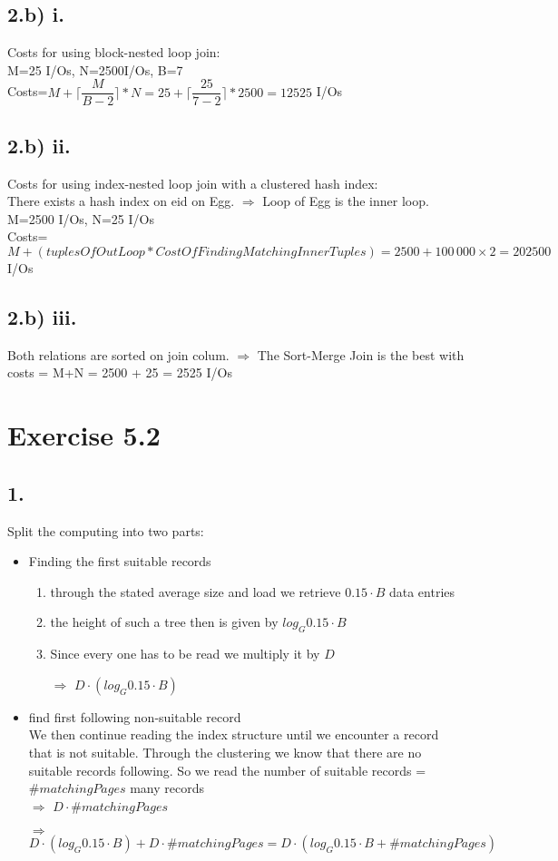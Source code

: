 \documentclass[12pt]{article}
\begin{document}
	\subsection*{2.b) i.}
	Costs for using block-nested loop join:\\
	M=25 I/Os, N=2500I/Os, B=7\\
	Costs=$M+\lceil \dfrac{M}{B-2} \rceil\ast N = 25+\lceil \dfrac{25}{7-2}\rceil \ast 2500=12525$ I/Os \\
	\subsection*{2.b) ii.}
	Costs for using index-nested loop join with a clustered hash index:\\
	There exists a hash index on eid on Egg. $\Rightarrow$ Loop of Egg is the inner loop.\\
	M=2500 I/Os, N=25 I/Os\\
	Costs=$M+(tuplesOfOutLoop\ast CostOfFindingMatchingInnerTuples)=2500+100\,000\times 2=202500$ I/Os
	\subsection*{2.b) iii.}
	Both relations are sorted on join colum. $\Rightarrow$ The Sort-Merge Join is the best with\\
	costs = M+N = 2500 + 25 = 2525 I/Os
	\section*{Exercise 5.2}
	\subsection*{1.}
		Split the computing into two parts:
		\begin{itemize}
			\item Finding the first suitable records\\
				\begin{enumerate}
					\item through the stated average size and load we retrieve $0.15\cdot B$ data entries
					\item the height of such a tree then is given by $log_G 0.15\cdot B$
					\item Since every one has to be read we multiply it by $D$
					\item[$\Rightarrow$] $D\cdot(log_G 0.15\cdot B)$
				\end{enumerate}				
			\item find first following non-suitable record\\ 
				We then continue reading the index structure until we encounter a record that is not suitable. Through the clustering we know that there are no suitable records following. So we read the number of suitable records = $\# matchingPages$ many records\\
				$\Rightarrow$ $D\cdot \# matchingPages$
			\item[$\Rightarrow$] $D\cdot(log_G 0.15\cdot B) + D\cdot \# matchingPages = D\cdot(log_G 0.15\cdot B + \# matchingPages)$
		\end{itemize}
\end{document}
